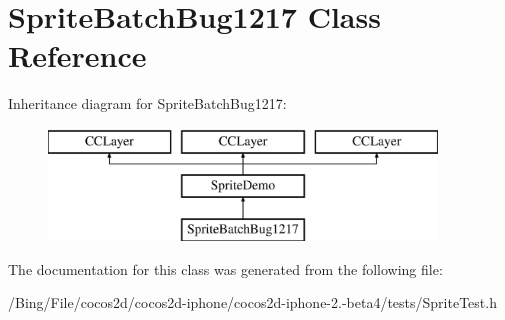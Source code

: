 \hypertarget{interface_sprite_batch_bug1217}{\section{Sprite\-Batch\-Bug1217 Class Reference}
\label{interface_sprite_batch_bug1217}
}
Inheritance diagram for Sprite\-Batch\-Bug1217\-:\begin{figure}[H]
\begin{center}
\leavevmode
\includegraphics[height=3.000000cm]{interface_sprite_batch_bug1217}
\end{center}
\end{figure}


The documentation for this class was generated from the following file\-:\begin{DoxyCompactItemize}
\item 
/\-Bing/\-File/cocos2d/cocos2d-\/iphone/cocos2d-\/iphone-\/2.-\/beta4/tests/Sprite\-Test.\-h\end{DoxyCompactItemize}
